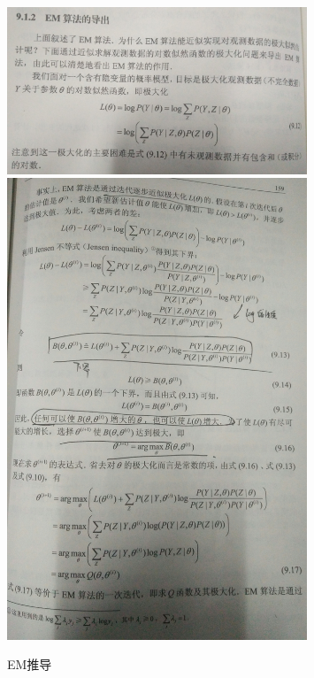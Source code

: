 \documentclass{ctexart}
\begin{document}
\begin{figure}[H]
\begin{center}
\includegraphics[width=0.8\textwidth]{fig/em-derive1.jpg} 
\includegraphics[width=0.8\textwidth]{fig/em-derive2.jpg} 
\caption{EM推导}
\end{center}
\end{figure}
\end{document}
